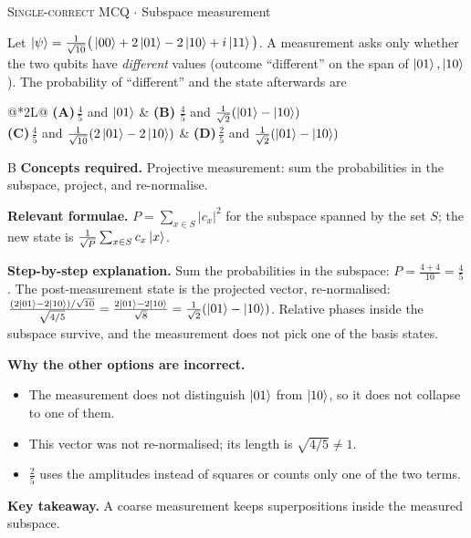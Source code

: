 \documentclass[11pt,a4paper]{article}
\newcommand{\optlabel}[1]{\textbf{(#1)}}
\newcommand{\correctlabel}[1]{\textcolor{okgreen}{\textbf{(#1)}\,\ding{51}}}
\newenvironment{qitem}[1]{\begin{list}{}{\setlength{\leftmargin}{3.3em}\setlength{\labelwidth}{3.1em}%
  \setlength{\labelsep}{0.2em}\setlength{\topsep}{3pt}\setlength{\parsep}{3pt}}\item[\textbf{Q.#1}\hfill]}{\end{list}}
\newcommand{\qsep}{\par\vspace{2pt}{\color{black!15}\hrule}\vspace{4pt}}
\newcommand{\qmeta}[2]{{\footnotesize\color{black!60}\textsc{#1} \;$\cdot$\; #2}\par}
\begin{document}
\begin{qitem}{29}
\qmeta{Single-correct MCQ}{Subspace measurement}
Let $\ket\psi = \frac{1}{\sqrt{10}}\big(\ket{00} + 2\ket{01} - 2\ket{10} + i\ket{11}\big)$. A measurement asks only whether the two qubits have \emph{different} values
(outcome ``different'' on the span of $\ket{01}, \ket{10}$). The probability of ``different'' and the state afterwards are
\par\smallskip\noindent\begin{tabularx}{\linewidth}{@{}*{2}{L}@{}}
\optlabel{A}\,$\frac45$ and $\ket{01}$ & \correctlabel{B}\,$\frac45$ and $\frac{1}{\sqrt2}(\ket{01} - \ket{10})$ \\[3pt]
\optlabel{C}\,$\frac45$ and $\frac{1}{\sqrt{10}}(2\ket{01} - 2\ket{10})$ & \optlabel{D}\,$\frac25$ and $\frac{1}{\sqrt2}(\ket{01} - \ket{10})$
\end{tabularx}
\end{qitem}
\begin{solbox}{B}
\textbf{\color{brand}Concepts required.} Projective measurement: sum the probabilities in the subspace, project, and re-normalise.

\textbf{\color{brand}Relevant formulae.} $P = \sum_{x\in S}|c_x|^2$ for the subspace spanned by the set $S$; the new state is $\frac{1}{\sqrt P}\sum_{x\in S}c_x\ket{x}$.

\textbf{\color{brand}Step-by-step explanation.} Sum the probabilities in the subspace: $P = \frac{4 + 4}{10} = \frac45$. The post-measurement state is the projected vector, re-normalised:
$\frac{(2\ket{01} - 2\ket{10})/\sqrt{10}}{\sqrt{4/5}} = \frac{2\ket{01} - 2\ket{10}}{\sqrt8} = \frac{1}{\sqrt2}(\ket{01} - \ket{10})$.
Relative phases inside the subspace survive, and the measurement does not pick one of the basis states.

\textbf{\color{brand}Why the other options are incorrect.}
\begin{itemize}[leftmargin=2.4em, itemsep=1pt, topsep=2pt]
\item[\textbf{(A)}] The measurement does not distinguish $\ket{01}$ from $\ket{10}$, so it does not collapse to one of them.
\item[\textbf{(C)}] This vector was not re-normalised; its length is $\sqrt{4/5} \ne 1$.
\item[\textbf{(D)}] $\frac25$ uses the amplitudes instead of squares or counts only one of the two terms.
\end{itemize}
\textbf{\color{brand}Key takeaway.} A coarse measurement keeps superpositions inside the measured subspace.
\end{solbox}
\qsep
\end{document}
